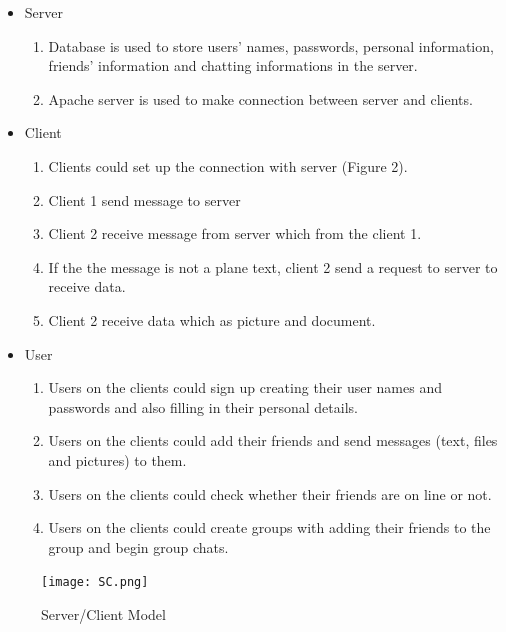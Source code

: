 \documentclass[a4paper]{article}
\begin{document}
\begin{itemize}




\item Server
\begin{enumerate}
\item Database is used to store users' names, passwords, personal information, friends' information and chatting informations in the server.
\item Apache server is used to make connection between server and clients.
\end{enumerate}








\item Client
\begin{enumerate}
\item Clients could set up the connection with server (Figure 2).
\item Client 1 send message to server
\item Client 2 receive message from server which from the client 1.
\item If the the message is not a plane text, client 2 send a request to server to receive data.
\item Client 2 receive data which as picture and document.

\end {enumerate}
\item User

\begin{enumerate}
\item Users on the clients could sign up creating their user names and passwords and also filling in their personal details.
\item Users on the clients could add their friends and send messages (text, files and pictures) to them.
\item Users on the clients could check whether their friends are on line or not.
\item  Users on the clients could create groups with adding their friends to the group and begin group chats.

\end{enumerate}
\end{itemize}
\begin{figure}[h]
\centering
\texttt{[image: SC.png]}
\caption{\label{fig:UML2}Server/Client Model}
\end{figure}
\end{document}
